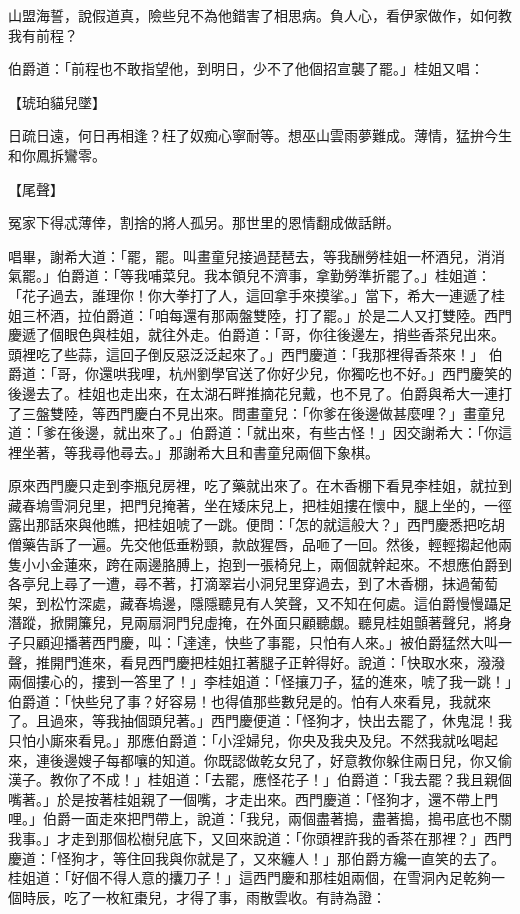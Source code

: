 山盟海誓，說假道真，險些兒不為他錯害了相思病。負人心，看伊家做作，如何教我有前程？

伯爵道：「前程也不敢指望他，到明日，少不了他個招宣襲了罷。」桂姐又唱：

【琥珀貓兒墜】

日疏日遠，何日再相逢？枉了奴痴心寧耐等。想巫山雲雨夢難成。薄情，猛拚今生和你鳳拆鸞零。

【尾聲】

冤家下得忒薄倖，割捨的將人孤另。那世里的恩情翻成做話餅。

唱畢，謝希大道：「罷，罷。叫畫童兒接過琵琶去，等我酬勞桂姐一杯酒兒，消消氣罷。」伯爵道：「等我哺菜兒。我本領兒不濟事，拿勤勞準折罷了。」桂姐道： 「花子過去，誰理你！你大拳打了人，這回拿手來摸挲。」當下，希大一連遞了桂姐三杯酒，拉伯爵道：「咱每還有那兩盤雙陸，打了罷。」於是二人又打雙陸。西門慶遞了個眼色與桂姐，就往外走。伯爵道：「哥，你往後邊左，捎些香茶兒出來。頭裡吃了些蒜，這回子倒反惡泛泛起來了。」西門慶道：「我那裡得香茶來！」 伯爵道：「哥，你還哄我哩，杭州劉學官送了你好少兒，你獨吃也不好。」西門慶笑的後邊去了。桂姐也走出來，在太湖石畔推摘花兒戴，也不見了。伯爵與希大一連打了三盤雙陸，等西門慶白不見出來。問畫童兒：「你爹在後邊做甚麼哩？」畫童兒道：「爹在後邊，就出來了。」伯爵道：「就出來，有些古怪！」因交謝希大：「你這裡坐著，等我尋他尋去。」那謝希大且和書童兒兩個下象棋。

原來西門慶只走到李瓶兒房裡，吃了藥就出來了。在木香棚下看見李桂姐，就拉到藏春塢雪洞兒里，把門兒掩著，坐在矮床兒上，把桂姐摟在懷中，腿上坐的，一徑露出那話來與他瞧，把桂姐唬了一跳。便問：「怎的就這般大？」西門慶悉把吃胡僧藥告訴了一遍。先交他低垂粉頸，款啟猩唇，品咂了一回。然後，輕輕搊起他兩隻小小金蓮來，跨在兩邊胳膊上，抱到一張椅兒上，兩個就幹起來。不想應伯爵到各亭兒上尋了一遭，尋不著，打滴翠岩小洞兒里穿過去，到了木香棚，抹過葡萄架，到松竹深處，藏春塢邊，隱隱聽見有人笑聲，又不知在何處。這伯爵慢慢躡足潛蹤，掀開簾兒，見兩扇洞門兒虛掩，在外面只顧聽覷。聽見桂姐顫著聲兒，將身子只顧迎播著西門慶，叫：「達達，快些了事罷，只怕有人來。」被伯爵猛然大叫一聲，推開門進來，看見西門慶把桂姐扛著腿子正幹得好。說道：「快取水來，潑潑兩個摟心的，摟到一答里了！」李桂姐道：「怪攘刀子，猛的進來，唬了我一跳！」伯爵道：「快些兒了事？好容易！也得值那些數兒是的。怕有人來看見，我就來了。且過來，等我抽個頭兒著。」西門慶便道：「怪狗才，快出去罷了，休鬼混！我只怕小廝來看見。」那應伯爵道：「小淫婦兒，你央及我央及兒。不然我就吆喝起來，連後邊嫂子每都嚷的知道。你既認做乾女兒了，好意教你躲住兩日兒，你又偷漢子。教你了不成！」桂姐道：「去罷，應怪花子！」伯爵道：「我去罷？我且親個嘴著。」於是按著桂姐親了一個嘴，才走出來。西門慶道：「怪狗才，還不帶上門哩。」伯爵一面走來把門帶上，說道：「我兒，兩個盡著搗，盡著搗，搗弔底也不關我事。」才走到那個松樹兒底下，又回來說道：「你頭裡許我的香茶在那裡？」西門慶道：「怪狗才，等住回我與你就是了，又來纏人！」那伯爵方纔一直笑的去了。桂姐道：「好個不得人意的攮刀子！」這西門慶和那桂姐兩個，在雪洞內足乾夠一個時辰，吃了一枚紅棗兒，才得了事，雨散雲收。有詩為證：

